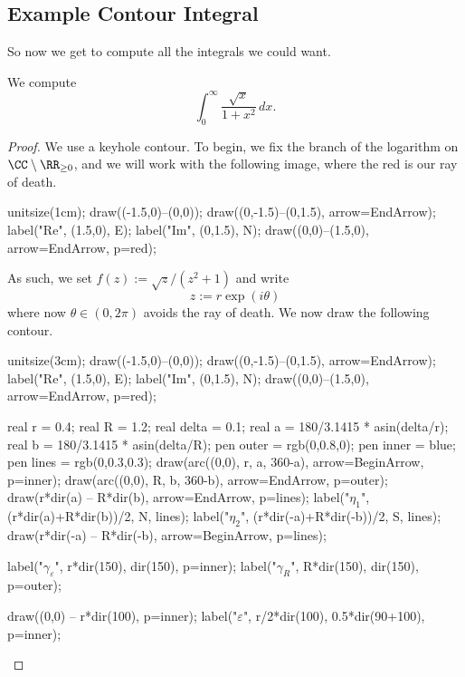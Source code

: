 \subsection{Example Contour Integral}
So now we get to compute all the integrals we could want.
\begin{exe}
	We compute
	\[\int_0^\infty\frac{\sqrt x}{1+x^2}\,dx.\]
\end{exe}
\begin{proof}
	We use a keyhole contour. To begin, we fix the branch of the logarithm on $\CC\setminus\RR_{\ge0}$, and we will work with the following image, where the red is our ray of death.
	\begin{center}
		\begin{asy}
			unitsize(1cm);
			draw((-1.5,0)--(0,0));
			draw((0,-1.5)--(0,1.5), arrow=EndArrow);
			label("$\textrm{Re}$", (1.5,0), E);
			label("$\textrm{Im}$", (0,1.5), N);
			draw((0,0)--(1.5,0), arrow=EndArrow, p=red);
		\end{asy}
	\end{center}
	As such, we set $f(z):=\sqrt z/\left(z^2+1\right)$ and write
	\[z:=r\exp(i\theta)\]
	where now $\theta\in(0,2\pi)$ avoids the ray of death. We now draw the following contour.
	\begin{center}
		\begin{asy}
			unitsize(3cm);
			draw((-1.5,0)--(0,0));
			draw((0,-1.5)--(0,1.5), arrow=EndArrow);
			label("$\textrm{Re}$", (1.5,0), E);
			label("$\textrm{Im}$", (0,1.5), N);
			draw((0,0)--(1.5,0), arrow=EndArrow, p=red);

			real r = 0.4;
			real R = 1.2;
			real delta = 0.1;
			real a = 180/3.1415 * asin(delta/r);
			real b = 180/3.1415 * asin(delta/R);
			pen outer = rgb(0,0.8,0);
			pen inner = blue;
			pen lines = rgb(0,0.3,0.3);
			draw(arc((0,0), r, a, 360-a), arrow=BeginArrow, p=inner);
			draw(arc((0,0), R, b, 360-b), arrow=EndArrow, p=outer);
			draw(r*dir(a) -- R*dir(b), arrow=EndArrow, p=lines);
			label("$\eta_1$", (r*dir(a)+R*dir(b))/2, N, lines);
			label("$\eta_2$", (r*dir(-a)+R*dir(-b))/2, S, lines);
			draw(r*dir(-a) -- R*dir(-b), arrow=BeginArrow, p=lines);

			label("$\gamma_\varepsilon$", r*dir(150), dir(150), p=inner);
			label("$\gamma_R$", R*dir(150), dir(150), p=outer);

			draw((0,0) -- r*dir(100), p=inner);
			label("$\varepsilon$", r/2*dir(100), 0.5*dir(90+100), p=inner);


\end{asy}
\end{center}
\end{proof}
